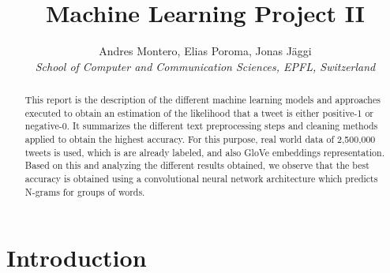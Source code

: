 \documentclass[10pt,conference,compsocconf]{IEEEtran}
\begin{document}
\title{Machine Learning Project II}

\author{
  Andres Montero, Elias Poroma, Jonas J\"aggi\\
  \textit{School of Computer and Communication Sciences, EPFL, Switzerland}
}

\maketitle

\begin{abstract}
This report is the description of the different machine learning
models and approaches executed to obtain an estimation of the 
likelihood that a tweet is either positive-1 or negative-0. 
It summarizes the different text preprocessing steps and cleaning 
methods applied to obtain the highest accuracy. For this purpose, real
world data of 2,500,000 tweets is used, which is are already labeled, and also GloVe embeddings representation. Based on this and analyzing the different
results obtained, we observe that the best accuracy is obtained using a
convolutional neural network architecture which predicts N-grams for groups of words.

\end{abstract}

\section{Introduction}
\end{document}
